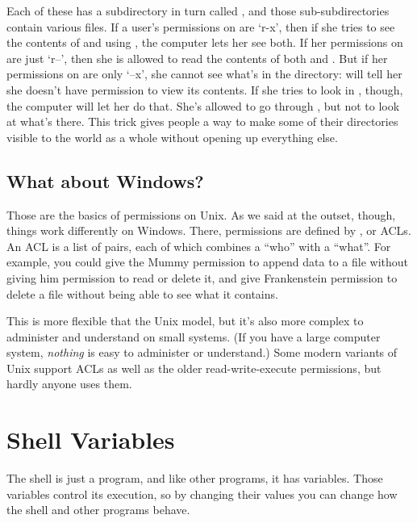 
Each of these has a subdirectory in turn called , and
those sub-subdirectories contain various files. If a user's permissions
on  are `r-x', then if she tries to see the contents of
 and  using , the computer
lets her see both. If her permissions on  are just `r--',
then she is allowed to read the contents of both  and
. But if her permissions on  are only
`--x', she cannot see what's in the  directory:
 will tell her she doesn't have permission to view its
contents. If she tries to look in , though, the
computer will let her do that. She's allowed to go through
, but not to look at what's there. This trick gives people
a way to make some of their directories visible to the world as a whole
without opening up everything else.

\subsection*{What about Windows?}

Those are the basics of permissions on Unix. As we said at the outset,
though, things work differently on Windows. There, permissions are
defined by , or
ACLs. An ACL is a list of pairs, each of which combines a ``who'' with a
``what''. For example, you could give the Mummy permission to append
data to a file without giving him permission to read or delete it, and
give Frankenstein permission to delete a file without being able to see
what it contains.

This is more flexible that the Unix model, but it's also more complex to
administer and understand on small systems. (If you have a large
computer system, \emph{nothing} is easy to administer or understand.)
Some modern variants of Unix support ACLs as well as the older
read-write-execute permissions, but hardly anyone uses them.

\section{Shell Variables}

The shell is just a program, and like other programs, it has variables.
Those variables control its execution, so by changing their values you
can change how the shell and other programs behave.

